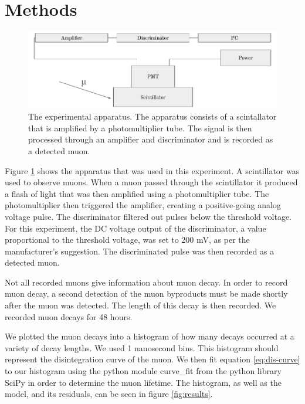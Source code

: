 \documentclass[%
 reprint,
 amsmath,amssymb,
 aps,
]{revtex4-2}
\begin{document}
\section{Methods}
\begin{figure}
	\centering
	\includegraphics{setup.pdf}
	\caption{\label{fig:setup}The experimental apparatus. The apparatus consists of a scintallator that is amplified by a photomultiplier tube. The signal is then processed through an amplifier and discriminator and is recorded as a detected muon.}
\end{figure}
Figure \ref{fig:setup} shows the apparatus that was used in this experiment. A scintillator was used to observe muons. When a muon passed through the scintillator it produced a flash of light that was then amplified using a photomultiplier tube. The photomultiplier then triggered the amplifier, creating a positive-going analog voltage pulse. The discriminator filtered out pulses below the threshold voltage. For this experiment, the DC voltage output of the discriminator, a value proportional to the threshold voltage, was set to 200 mV, as per the manufacturer's suggestion. The discriminated pulse was then recorded as a detected muon.
\par
Not all recorded muons give information about muon decay. In order to record muon decay, a second detection of the muon byproducts must be made shortly after the muon was detected. The length of this decay is then recorded. We recorded muon decays for 48 hours.
\par
We plotted the muon decays into a histogram of how many decays occurred at a variety of decay lengths. We used 1 nanosecond bins. This histogram should represent the disintegration curve of the muon. We then fit equation \ref{eq:dis-curve} to our histogram using the python module curve\_fit from the python library SciPy in order to determine the muon lifetime. The histogram, as well as the model, and its residuals, can be seen in figure \ref{fig:results}.
\end{document}
